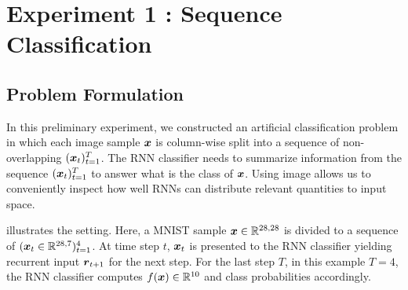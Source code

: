 

 

\clearpage
\section{Experiment 1 : Sequence Classification}
\label{sec:exp1}

\subsection{Problem Formulation}
In this preliminary experiment, we constructed an artificial classification problem in which each image sample $\boldsymbol{x}$ is column-wise split into a sequence of non-overlapping $(\boldsymbol{x}_t)_{t=1}^{T}$. The RNN classifier needs to summarize information from the sequence $(\boldsymbol{x}_t)_{t=1}^{T}$ to answer what is the class of $\boldsymbol{x}$.   Using image allows us to conveniently inspect how well RNNs can distribute relevant quantities to input space. 

\addfigure{\ref{fig:artificial_problem}} illustrates the setting. Here, a MNIST sample $ \patvector{x} \in \mathbb{R}^{28,28}$ is divided to a sequence of $( \patvector{x}_t \in   \mathbb{R}^{28,7} )_{t=1} ^ 4$. At time step $t$, $\patvector{x}_t$ is presented to the RNN classifier yielding recurrent input $\patvector{r}_{t+1}$ for the next step. For the last step $T$, in this example $T = 4$, the RNN classifier computes $f(\boldsymbol{x}) \in \mathbb{R}^{10}$ and class probabilities accordingly.


